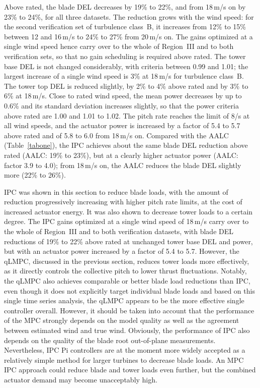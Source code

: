 Above rated, the blade DEL decreases by 19\% to 22\%, and from 18\,m/s on by 23\% to 24\%, for all three datasets. The reduction grows with the wind speed: for the second verification set of turbulence class~B, it increases from 12\% to 15\% between 12 and 16\,m/s to 24\% to 27\% from 20\,m/s on. The gains optimized at a single wind speed hence carry over to the whole of Region~III and to both verification sets, so that no gain scheduling is required above rated. The tower base DEL is not changed considerably, with criteria between 0.99 and 1.01; the largest increase of a single wind speed is 3\% at 18\,m/s for turbulence class~B. The tower top DEL is reduced slightly, by 2\% to 4\% above rated and by 3\% to 6\% at 18\,m/s. Close to rated wind speed, the mean power decreases by up to 0.6\% and its standard deviation increases slightly, so that the power criteria above rated are 1.00 and 1.01 to 1.02. The pitch rate reaches the limit of 8\textdegree/s at all wind speeds, and the actuator power is increased by a factor of 5.4 to 5.7 above rated and of 5.8 to 6.0 from 18\,m/s on. Compared with the AALC (Table~\ref{tabone}), the IPC achieves about the same blade DEL reduction above rated (AALC: 19\% to 23\%), but at a clearly higher actuator power (AALC: factor 3.9 to 4.0); from 18\,m/s on, the AALC reduces the blade DEL slightly more (22\% to 26\%).


IPC was shown in this section to reduce blade loads, with the amount of reduction progressively increasing with higher pitch rate limits, at the cost of increased actuator energy. It was also shown to decrease tower loads to a certain degree. The IPC gains optimized at a single wind speed of 18\,m/s carry over to the whole of Region~III and to both verification datasets, with blade DEL reductions of 19\% to 22\% above rated at unchanged tower base DEL and power, but with an actuator power increased by a factor of 5.4 to 5.7. 
However, the qLMPC, discussed in the previous section, reduces tower loads more effectively, as it directly controls the collective pitch to lower thrust fluctuations. Notably, the qLMPC also achieves comparable or 
better blade load reductions than IPC, even though it does not explicitly target 
individual blade loads and based on this single time series analysis, the qLMPC appears to 
be the more effective single controller overall. However, it should be taken into account that the performance of the MPC strongly depends on the model quality as well as the agreement between estimated wind and true wind. Obviously, the performance of IPC also depends on the quality of the blade root out-of-plane measurements. Nevertheless, IPC Pi controllers are at the moment more widely accepted as a relatively simple method for larger turbines to decrease blade loads. An MPC IPC approach could reduce blade and tower loads even further, but the combined actuator demand may become 
unacceptably high.

